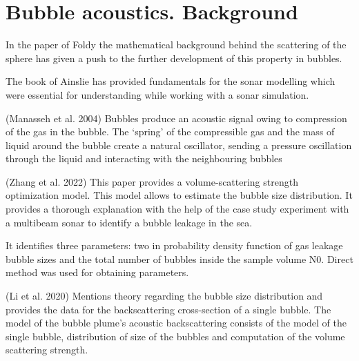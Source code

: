 \section{Bubble acoustics. Background} 

In the paper of Foldy the mathematical background behind the scattering of the sphere has given a push to the further development of this property in bubbles.

The book of Ainslie has provided fundamentals for the sonar modelling which were essential for understanding while working with a sonar simulation. 

(Manasseh et al. 2004\cite{manasseh_anisotropy_2004}) Bubbles produce an acoustic signal owing to compression of the gas in the bubble. The ‘spring’ of the compressible gas and the mass of liquid around the bubble create a natural oscillator, sending a pressure oscillation through the liquid and interacting with the neighbouring bubbles

(Zhang et al. 2022\cite{zhang_efficient_2022}) This paper provides a volume-scattering strength optimization model. This model allows to estimate the bubble size distribution. It provides a thorough explanation with the help of the case study experiment with a multibeam sonar to identify a bubble leakage in the sea.

It identifies three parameters: two in probability density function of gas leakage bubble sizes and the total number of bubbles inside the sample volume N0. Direct method was used for obtaining parameters.

(Li et al. 2020\cite{li_broadband_2020}) Mentions theory regarding the bubble size distribution and provides the data for the backscattering cross-section of a single bubble. The model of the bubble plume’s acoustic backscattering consists of the model of the single bubble, distribution of size of the bubbles and computation of the volume scattering strength.

